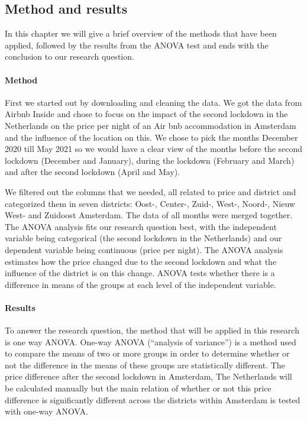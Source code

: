 \documentclass[
]{article}
\begin{document}
\hypertarget{method-and-results}{%
\subsection{Method and results}\label{method-and-results}}

In this chapter we will give a brief overview of the methods that have
been applied, followed by the results from the ANOVA test and ends with
the conclusion to our research question.

\hypertarget{method}{%
\paragraph{Method}\label{method}}

First we started out by downloading and cleaning the data. We got the
data from Airbnb Inside and chose to focus on the impact of the second
lockdown in the Netherlands on the price per night of an Air bnb
accommodation in Amsterdam and the influence of the location on this. We
chose to pick the months December 2020 till May 2021 so we would have a
clear view of the months before the second lockdown (December and
January), during the lockdown (February and March) and after the second
lockdown (April and May).

We filtered out the columns that we needed, all related to price and
district and categorized them in seven districts: Oost-, Center-, Zuid-,
West-, Noord-, Nieuw West- and Zuidoost Amsterdam. The data of all
months were merged together. The ANOVA analysis fits our research
question best, with the independent variable being categorical (the
second lockdown in the Netherlands) and our dependent variable being
continuous (price per night). The ANOVA analysis estimates how the price
changed due to the second lockdown and what the influence of the
district is on this change. ANOVA tests whether there is a difference in
means of the groups at each level of the independent variable.

\hypertarget{results}{%
\paragraph{Results}\label{results}}

To answer the research question, the method that will be applied in this
research is one way ANOVA. One-way ANOVA (``analysis of variance'') is a
method used to compare the means of two or more groups in order to
determine whether or not the difference in the means of these groups are
statistically different. The price difference after the second lockdown
in Amsterdam, The Netherlands will be calculated manually but the main
relation of whether or not this price difference is significantly
different across the districts within Amsterdam is tested with one-way
ANOVA.
\end{document}
